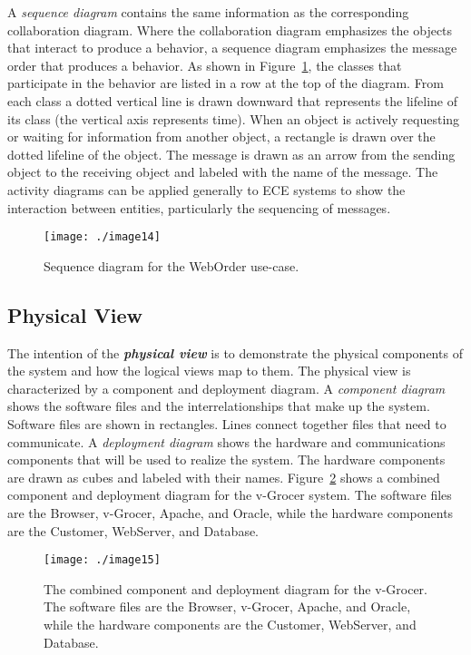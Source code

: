A \emph{sequence diagram} contains the same information as the
corresponding collaboration diagram. Where the collaboration diagram
emphasizes the objects that interact to produce a behavior, a sequence
diagram emphasizes the message order that produces a behavior. As shown
in Figure~\ref{figure:sequenceDiagramWebOrder}, 
the classes that participate in the behavior are listed
in a row at the top of the diagram. From each class a dotted vertical
line is drawn downward that represents the lifeline of its class (the
vertical axis represents time). When an object is actively requesting or
waiting for information from another object, a rectangle is drawn over
the dotted lifeline of the object. The message is drawn as an arrow from
the sending object to the receiving object and labeled with the name of
the message. The activity diagrams can be applied generally to ECE
systems to show the interaction between entities, particularly the
sequencing of messages.

\begin{figure}[h]
\centering
\texttt{[image: ./image14]}
\caption{Sequence diagram for the WebOrder use-case.}
\label{figure:sequenceDiagramWebOrder}
\end{figure}

\subsection{Physical View}
\label{subsection:physical-view}

The intention of the \emph{\textbf{physical view}} is to demonstrate the
physical components of the system and how the logical views map to them.
The physical view is characterized by a component and deployment
diagram. A \emph{component diagram} shows the software files and the
interrelationships that make up the system. Software files are shown in
rectangles. Lines connect together files that need to communicate. A
\emph{deployment diagram} shows the hardware and communications
components that will be used to realize the system. The hardware
components are drawn as cubes and labeled with their names. 
Figure~\ref{figure:vGrocerSystem}
shows a combined component and deployment diagram for the v-Grocer
system. The software files are the Browser, v-Grocer, Apache, and
Oracle, while the hardware components are the Customer, WebServer, and
Database.

\begin{figure}[h]
\centering
\texttt{[image: ./image15]}
\caption{The combined component and deployment diagram for
the v-Grocer. The software files are the Browser, v-Grocer, Apache, and
Oracle, while the hardware components are the Customer, WebServer, and
Database.}
\label{figure:vGrocerSystem}
\end{figure}


